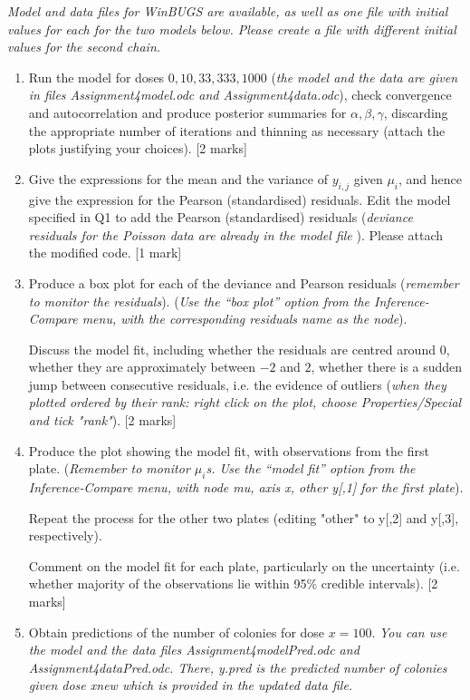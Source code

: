 \documentclass[12pt]{report}
\begin{document}
{\it Model and data files for WinBUGS are available, as well as one file with initial values for each for the two models below. Please create a file with different initial values  for the second chain. }

\begin{enumerate}
\item Run the model for doses $0,10,33,333,1000$ ({\it the model and the data are given in files Assignment4model.odc and Assignment4data.odc}), check convergence and autocorrelation and produce posterior summaries for $\alpha,\beta,\gamma$, discarding the appropriate number of iterations and thinning as necessary (attach the plots justifying your choices). [2 marks]

\item Give the expressions for the mean and the variance of $y_{i,j}$ given $\mu_i$, and hence give the expression for the Pearson (standardised) residuals.
    Edit the model specified in Q1 to add the Pearson (standardised) residuals ({\it deviance residuals for the Poisson data are already in the model file }). Please attach the modified code. [1 mark]

 \item Produce a box plot for each of the deviance and Pearson residuals ({\it remember to monitor the residuals}).
({\it Use the “box plot” option from the Inference-Compare menu,  with the corresponding residuals name as the node}).

Discuss the model fit, including whether the residuals are centred around 0, whether they are approximately between $-2$ and $2$, whether there is a sudden jump between consecutive residuals, i.e. the evidence of outliers ({\it when they plotted ordered by their rank: right click on the plot, choose Properties/Special and tick "rank"}). [2 marks]

 \item Produce the plot showing the model fit, with observations from the first plate.
({\it Remember to monitor $\mu_i$s. Use the “model fit” option from the Inference-Compare menu, with node mu, axis x, other y[,1] for the first plate}).

Repeat the process for the other two plates (editing "other" to y[,2] and y[,3], respectively).

Comment on the model fit for each plate, particularly on the uncertainty (i.e. whether majority of the observations lie within 95\% credible intervals). [2 marks]

\item  Obtain predictions of the number of colonies for dose $x =100$. {\it You can use the model and the data files Assignment4modelPred.odc and Assignment4dataPred.odc. There, y.pred is the predicted number of colonies given dose xnew which is provided in the updated data file. }


\end{enumerate}
\end{document}
